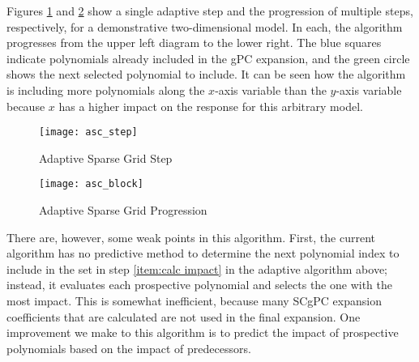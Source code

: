 Figures \ref{fig:asg step} and \ref{fig:asg block} show a single adaptive
step and the progression of multiple steps, respectively, for a demonstrative two-dimensional model.  In each, 
the algorithm progresses from the upper
left diagram to the lower right.  The blue squares indicate polynomials already included in the gPC expansion, and the green circle
shows the next selected polynomial to include.  It can be seen how the algorithm is including more polynomials
along the $x$-axis variable than the $y$-axis variable because $x$ has a higher impact on the response for
this arbitrary model.
\begin{figure}[H]
  \centering
  \texttt{[image: asc\_step]}
  \caption{Adaptive Sparse Grid Step}
  \label{fig:asg step}
\end{figure}
\begin{figure}[H]
  \centering
  \texttt{[image: asc\_block]}
  \caption{Adaptive Sparse Grid Progression}
  \label{fig:asg block}
\end{figure}

There are, however, some weak points in this algorithm.  First, the current algorithm has no predictive method
to determine the next polynomial index to include in the set in step \ref{item:calc impact} in the adaptive
algorithm above; instead, it evaluates each prospective polynomial and
selects the one with the most impact.  This is somewhat inefficient, because many SCgPC expansion coefficients
that are calculated are not used in the final expansion.  
One improvement we make to this algorithm is to predict the impact of
prospective polynomials based on the impact of predecessors.

